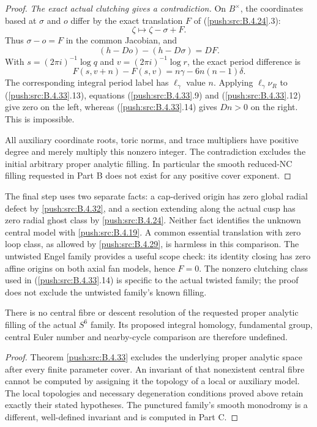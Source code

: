 \begin{proof}
\emph{The exact actual clutching gives a contradiction.}
On $B^\times$, the coordinates based at
$\sigma$ and $o$ differ by the exact
translation $F$ of (\ref{push:src:B.4.24}.3):
\[
 \zeta\longmapsto\zeta-\sigma+F.
\]
Thus $\sigma-o=F$ in the common Jacobian,
and
\[
 (h-D o)-(h-D\sigma)=D F.
 \tag{B.4.33.13}
\]
With $s=(2\pi i)^{-1}\log q$ and
$v=(2\pi i)^{-1}\log r$, the exact
period difference is
\[
 F(s,v+n)-F(s,v)
       =n\gamma-6n(n-1)\delta.
 \tag{B.4.33.14}
\]
The corresponding integral period label
has $\ell_\gamma$ value $n$.
Applying $\ell_\gamma\nu_R$ to
(\ref{push:src:B.4.33}.13), equations (\ref{push:src:B.4.33}.9) and
(\ref{push:src:B.4.33}.12) give zero on the left,
whereas (\ref{push:src:B.4.33}.14) gives $Dn>0$ on
the right. This is impossible.

All auxiliary coordinate roots, toric
norms, and trace multipliers have positive
degree and merely multiply this nonzero
integer. The contradiction excludes the
initial arbitrary proper analytic filling.
In particular the smooth reduced-NC
filling requested in Part B does not
exist for any positive cover exponent.
\end{proof}

The final step uses two separate facts: a
cap-derived origin has zero global radial
defect by \ref{push:src:B.4.32}, and a section extending
along the actual cusp has zero radial
ghost class by \ref{push:src:B.4.24}. Neither fact
identifies the unknown central model with
\ref{push:src:B.4.19}. A common essential translation
with zero loop class, as allowed by
\ref{push:src:B.4.29}, is harmless in this comparison.
The untwisted Engel family provides a
useful scope check: its identity closing
has zero affine origins on both axial
fan models, hence $F=0$. The nonzero
clutching class used in (\ref{push:src:B.4.33}.14)
is specific to the actual twisted
family; the proof does not exclude
the untwisted family's known filling.


\begin{corollary}\label{push:src:B.5.1}\label{push:B51}
There is no central fibre or descent resolution
of the requested proper analytic filling of the
actual $S^6$ family. Its proposed integral homology,
fundamental group, central Euler number and
nearby-cycle comparison are therefore undefined.
\end{corollary}

\begin{proof}
Theorem \ref{push:src:B.4.33} excludes the underlying proper
analytic space after every finite parameter cover.
An invariant of that nonexistent central fibre
cannot be computed by assigning it the topology
of a local or auxiliary model. The local topologies
and necessary degeneration conditions proved above
retain exactly their stated hypotheses. The
punctured family's smooth monodromy is a different,
well-defined invariant and is computed in Part C.
\end{proof}



